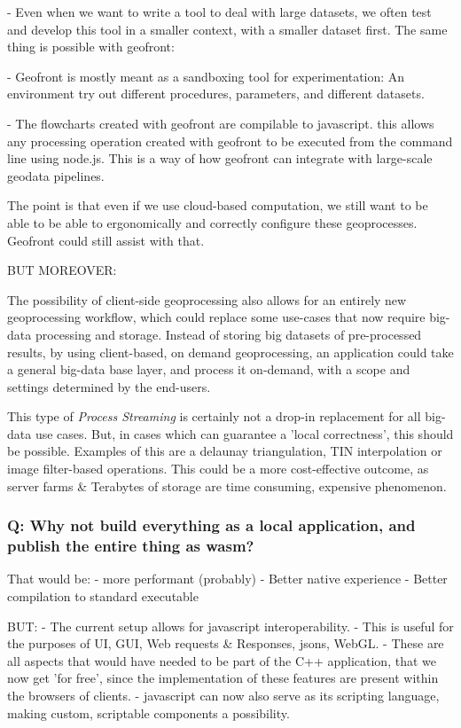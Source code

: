 - Even when we want to write a tool to deal with large datasets, we often test and develop this tool in a smaller context, with a smaller dataset first. The same thing is possible with geofront: 

- Geofront is mostly meant as a sandboxing tool for experimentation: An environment try out different procedures, parameters, and different datasets. 

- The flowcharts created with geofront are compilable to javascript. this allows any processing operation created with geofront to be executed from the command line using node.js. This is a way of how geofront can integrate with large-scale geodata pipelines. 

The point is that even if we use cloud-based computation, we still want to be able to be able to ergonomically and correctly configure these geoprocesses. Geofront could still assist with that.

BUT MOREOVER:

The possibility of client-side geoprocessing also allows for an entirely new geoprocessing workflow, which could replace some use-cases that now require big-data processing and storage. Instead of storing big datasets of pre-processed results, by using client-based, on demand geoprocessing, an application could take a general big-data base layer, and process it on-demand, with a scope and settings determined by the end-users. 

This type of \emph{Process Streaming} is certainly not a drop-in replacement for all big-data use cases. But, in cases which can guarantee a 'local correctness', this should be possible. Examples of this are a delaunay triangulation, TIN interpolation or image filter-based operations. This could be a more cost-effective outcome, as server farms \& Terabytes of storage are time consuming, expensive phenomenon.

\subsubsection*{Q: Why not build everything as a local application, and publish the entire thing as wasm?}

That would be:
- more performant (probably)
- Better native experience
- Better compilation to standard executable

BUT:
- The current setup allows for javascript interoperability. 
  - This is useful for the purposes of UI, GUI, Web requests \& Responses, jsons, WebGL.
  - These are all aspects that would have needed to be part of the C++ application, that we now get 'for free', since the implementation of these features are present within the browsers of clients. 
- javascript can now also serve as its scripting language, making custom, scriptable components a possibility.

